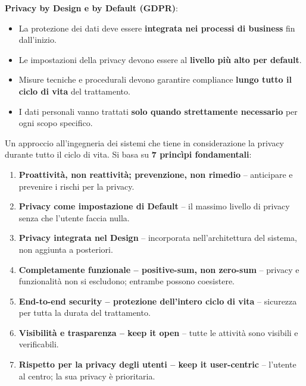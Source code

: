 \documentclass[a4paper,11pt]{article}
\begin{document}
\textbf{Privacy by Design e by Default (GDPR)}:
\begin{itemize}
  \item La protezione dei dati deve essere \textbf{integrata nei processi di business} fin dall'inizio.
  \item Le impostazioni della privacy devono essere al \textbf{livello pi\`{u} alto per default}.
  \item Misure tecniche e procedurali devono garantire compliance \textbf{lungo tutto il ciclo di vita} del trattamento.
  \item I dati personali vanno trattati \textbf{solo quando strettamente necessario} per ogni scopo specifico.
\end{itemize}

\begin{definizione}
Un approccio all'ingegneria dei sistemi che tiene in considerazione la privacy durante tutto il ciclo di vita. Si basa su \textbf{7 princìpi fondamentali}:
\begin{enumerate}
  \item \textbf{Proattivit\`{a}, non reattivit\`{a}; prevenzione, non rimedio} -- anticipare e prevenire i rischi per la privacy.
  \item \textbf{Privacy come impostazione di Default} -- il massimo livello di privacy senza che l'utente faccia nulla.
  \item \textbf{Privacy integrata nel Design} -- incorporata nell'architettura del sistema, non aggiunta a posteriori.
  \item \textbf{Completamente funzionale -- positive-sum, non zero-sum} -- privacy e funzionalit\`{a} non si escludono; entrambe possono coesistere.
  \item \textbf{End-to-end security -- protezione dell'intero ciclo di vita} -- sicurezza per tutta la durata del trattamento.
  \item \textbf{Visibilit\`{a} e trasparenza -- keep it open} -- tutte le attivit\`{a} sono visibili e verificabili.
  \item \textbf{Rispetto per la privacy degli utenti -- keep it user-centric} -- l'utente al centro; la sua privacy \`{e} prioritaria.
\end{enumerate}
\end{definizione}
\end{document}
